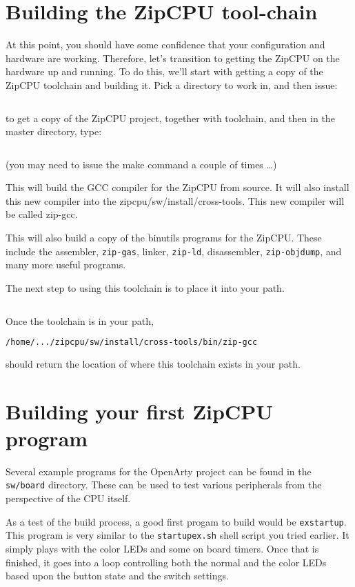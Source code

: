 \documentclass{gqtekspec}
\begin{document}
\section{Building the ZipCPU tool-chain}
At this point, you should have some confidence that your configuration and
hardware are working.  Therefore, let's transition to getting the ZipCPU
on the hardware up and running.  To do this, we'll start with getting a copy
of the ZipCPU toolchain and building it.  Pick a directory to work in, and
then issue:
\begin{lstlisting}[language=bash]
% git clone https://github.com/ZipCPU/zipcpu
\end{lstlisting}
to get a copy of the ZipCPU project, together with toolchain, and then
in the master directory, type:
\begin{lstlisting}[language=bash]
% cd zipcpu; make
\end{lstlisting}
(you may need to issue the make command a couple of times \ldots)

This will build the GCC compiler for the ZipCPU from source.  
It will also install this new compiler into the zipcpu/sw/install/cross-tools.
This new compiler will be called zip-gcc.

This will also build a copy of the binutils programs for the ZipCPU.  These
include the assembler, {\tt zip-gas}, linker, {\tt zip-ld}, disassembler,
{\tt zip-objdump}, and many more useful programs.

The next step to using this toolchain is to place it into your path.
\begin{lstlisting}[language=bash]
% export PATH=$PATH:$PWD/zipcpu/install/cross-tools/bin
\end{lstlisting}
Once the toolchain is in your path,
\begin{lstlisting}[language=bash]
% which zip-gcc
/home/.../zipcpu/sw/install/cross-tools/bin/zip-gcc
\end{lstlisting}
should return the location of where this toolchain exists in your path.

\section{Building your first ZipCPU program}
Several example programs for the OpenArty project can be found in the
{\tt sw/board} directory.  These can be used to test various peripherals from
the perspective of the CPU itself.

As a test of the build process, a good first progam to build would be 
{\tt exstartup}.  This program is very similar to the {\tt startupex.sh} shell
script you tried earlier.  It simply plays with the color LEDs and some
on board timers.   Once that is finished, it goes into a loop controlling
both the normal and the color LEDs based upon the button state and the switch
settings.
\end{document}
